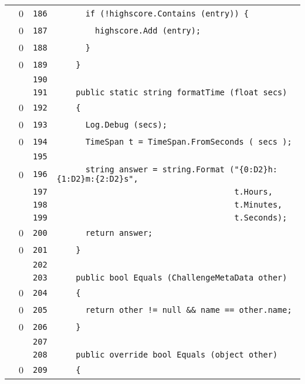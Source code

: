 \documentclass[a4paper,10pt]{article}
\begin{document}
\begin{longtable}[l]{lrrl}
\cellcolor{red} & 0 & \verb~186~ & \verb~      if (!highscore.Contains (entry)) {~\\
\cellcolor{red} & 0 & \verb~187~ & \verb~        highscore.Add (entry);~\\
\cellcolor{red} & 0 & \verb~188~ & \verb~      }~\\
\cellcolor{red} & 0 & \verb~189~ & \verb~    }~\\
\cellcolor{gray} &  & \verb~190~ & \verb~~\\
\cellcolor{gray} &  & \verb~191~ & \verb~    public static string formatTime (float secs)~\\
\cellcolor{red} & 0 & \verb~192~ & \verb~    {~\\
\cellcolor{red} & 0 & \verb~193~ & \verb~      Log.Debug (secs);~\\
\cellcolor{red} & 0 & \verb~194~ & \verb~      TimeSpan t = TimeSpan.FromSeconds ( secs );~\\
\cellcolor{gray} &  & \verb~195~ & \verb~~\\
\cellcolor{red} & 0 & \verb~196~ & \verb~      string answer = string.Format ("{0:D2}h:{1:D2}m:{2:D2}s",~\\
\cellcolor{gray} &  & \verb~197~ & \verb~                                     t.Hours,~\\
\cellcolor{gray} &  & \verb~198~ & \verb~                                     t.Minutes,~\\
\cellcolor{gray} &  & \verb~199~ & \verb~                                     t.Seconds);~\\
\cellcolor{red} & 0 & \verb~200~ & \verb~      return answer;~\\
\cellcolor{red} & 0 & \verb~201~ & \verb~    }~\\
\cellcolor{gray} &  & \verb~202~ & \verb~~\\
\cellcolor{gray} &  & \verb~203~ & \verb~    public bool Equals (ChallengeMetaData other)~\\
\cellcolor{red} & 0 & \verb~204~ & \verb~    {~\\
\cellcolor{red} & 0 & \verb~205~ & \verb~      return other != null && name == other.name;~\\
\cellcolor{red} & 0 & \verb~206~ & \verb~    }~\\
\cellcolor{gray} &  & \verb~207~ & \verb~~\\
\cellcolor{gray} &  & \verb~208~ & \verb~    public override bool Equals (object other)~\\
\cellcolor{red} & 0 & \verb~209~ & \verb~    {~\\

\end{longtable}
\end{document}
